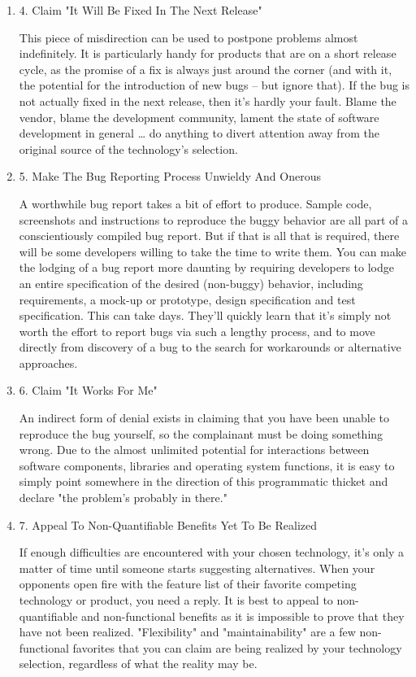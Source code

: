 \documentclass{article}
\begin{document}
\begin{enumerate}
\begin{enumerate}
\item 4. Claim "It Will Be Fixed In The Next Release"
\label{sec:orgheadline40}

This piece of misdirection can be used to postpone problems almost
indefinitely. It is particularly handy for products that are on a short
release cycle, as the promise of a fix is always just around the corner
(and with it, the potential for the introduction of new bugs -- but
ignore that). If the bug is not actually fixed in the next release, then
it's hardly your fault. Blame the vendor, blame the development
community, lament the state of software development in general \ldots{} do
anything to divert attention away from the original source of the
technology's selection.

\item 5. Make The Bug Reporting Process Unwieldy And Onerous
\label{sec:orgheadline41}

A worthwhile bug report takes a bit of effort to produce. Sample code,
screenshots and instructions to reproduce the buggy behavior are all
part of a conscientiously compiled bug report. But if that is all that
is required, there will be some developers willing to take the time to
write them. You can make the lodging of a bug report more daunting by
requiring developers to lodge an entire specification of the desired
(non-buggy) behavior, including requirements, a mock-up or prototype,
design specification and test specification. This can take days. They'll
quickly learn that it's simply not worth the effort to report bugs via
such a lengthy process, and to move directly from discovery of a bug to
the search for workarounds or alternative approaches.

\item 6. Claim "It Works For Me"
\label{sec:orgheadline42}

An indirect form of denial exists in claiming that you have been unable
to reproduce the bug yourself, so the complainant must be doing
something wrong. Due to the almost unlimited potential for interactions
between software components, libraries and operating system functions,
it is easy to simply point somewhere in the direction of this
programmatic thicket and declare "the problem's probably in there."

\item 7. Appeal To Non-Quantifiable Benefits Yet To Be Realized
\label{sec:orgheadline43}

If enough difficulties are encountered with your chosen technology, it's
only a matter of time until someone starts suggesting alternatives. When
your opponents open fire with the feature list of their favorite
competing technology or product, you need a reply. It is best to appeal
to non-quantifiable and non-functional benefits as it is impossible to
prove that they have not been realized. "Flexibility" and
"maintainability" are a few non-functional favorites that you can claim
are being realized by your technology selection, regardless of what the
reality may be.


\end{enumerate}
\end{enumerate}
\end{document}
